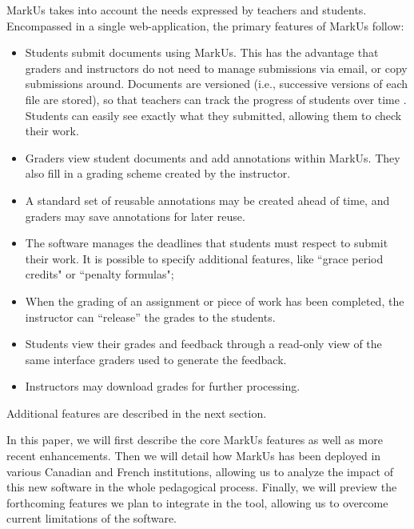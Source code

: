 \documentclass[twocolumn,10pt]{asme2e}
\begin{document}
MarkUs takes into account the needs expressed by teachers and students. Encompassed in a single web-application, the primary features of MarkUs follow:
\begin{itemize}
\item Students submit documents using MarkUs. This has the advantage that graders and instructors do not need to manage submissions via email, or copy submissions around. Documents are versioned (i.e., successive versions of each file are stored), so that teachers can track the progress of students over time \cite{Reid05learningby}. Students can easily see exactly what they submitted, allowing them to check their work.
\item Graders view student documents and add annotations within MarkUs. They also fill in a grading scheme created by the instructor. 
\item A standard set of reusable annotations may be created ahead of time, and graders may save annotations for later reuse.
\item The software manages the deadlines that students must respect to submit their work. It is possible to specify additional features, like ``grace period credits" or ``penalty formulas";
\item When the grading of an assignment or piece of work has been completed, the instructor can ``release'' the grades to the students.
\item Students view their grades and feedback through a read-only view of the same interface graders used to generate the feedback.
\item Instructors may download grades for further processing.
\end{itemize}

Additional features are described in the next section.


In this paper, we will first describe the core MarkUs features as well as more recent enhancements. Then we will detail how MarkUs has been deployed in various Canadian and French institutions, allowing us to analyze the impact of this new software in the whole pedagogical process. Finally, we will preview the forthcoming features we plan to integrate in the tool, allowing us to overcome current limitations of the software. 
\end{document}
